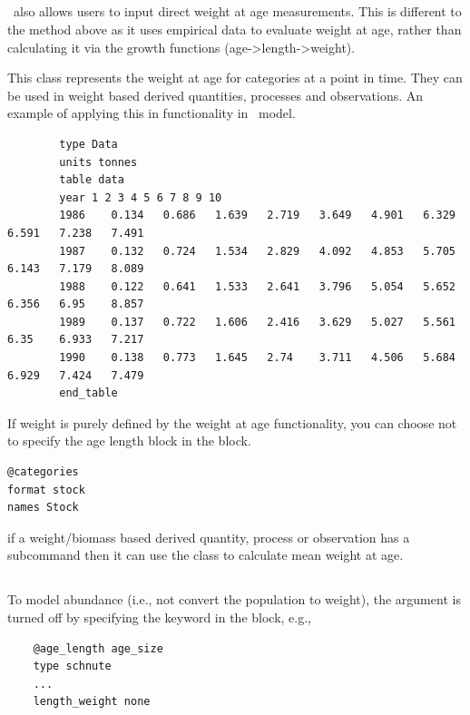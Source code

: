 \subsection{\label{sec:weight-at-age}}

\CNAME\ also allows users to input direct weight at age measurements. This is different to the method above as it uses empirical data to evaluate weight at age, rather than calculating it via the growth functions (age->length->weight). 

This class represents the weight at age for categories at a point in time. They can be used in weight based derived quantities, processes and observations. An example of applying this in functionality in \CNAME\ model.

{\small{\begin{verbatim}
		type Data
		units tonnes
		table data
		year 1 2 3 4 5 6 7 8 9 10
		1986	0.134	0.686	1.639	2.719	3.649	4.901	6.329	6.591	7.238	7.491
		1987	0.132	0.724	1.534	2.829	4.092	4.853	5.705	6.143	7.179	8.089
		1988	0.122	0.641	1.533	2.641	3.796	5.054	5.652	6.356	6.95	8.857
		1989	0.137	0.722	1.606	2.416	3.629	5.027	5.561	6.35	6.933	7.217
		1990	0.138	0.773	1.645	2.74	3.711	4.506	5.684	6.929	7.424	7.479
		end_table
		\end{verbatim}}}
	
If weight is purely defined by the weight at age functionality, you can choose not to specify the age length block in the  block.

{\small{\begin{verbatim}
@categories 
format stock
names Stock
\end{verbatim}}}

if a weight/biomass based derived quantity, process or observation has a  subcommand then it can use the  class to calculate mean weight at age.

\subsection{\label{sec:weightless-model}}

To model abundance (i.e., not convert the population to weight), the  argument is turned off by specifying the keyword  in the  block, e.g.,
{\small{\begin{verbatim}
	@age_length age_size
	type schnute
	...
	length_weight none
	\end{verbatim}}}


